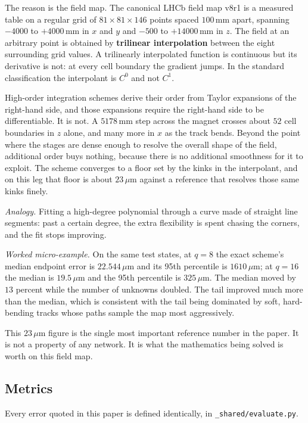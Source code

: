 \documentclass[11pt,a4paper]{article}
\newcommand{\um}{\ensuremath{\,\mu\mathrm{m}}}
\newcommand{\mm}{\ensuremath{\,\mathrm{mm}}}
\begin{document}
The reason is the field map. The canonical LHCb field map v8r1 is a measured
table on a regular grid of $81 \times 81 \times 146$ points spaced $100\mm$
apart, spanning $-4000$ to $+4000\mm$ in $x$ and $y$ and $-500$ to
$+14000\mm$ in $z$. The field at an arbitrary point is obtained by
\textbf{trilinear interpolation} between the eight surrounding grid values. A
trilinearly interpolated function is continuous but its derivative is not: at
every cell boundary the gradient jumps. In the standard classification the
interpolant is $C^0$ and not $C^1$.

High-order integration schemes derive their order from Taylor expansions of the
right-hand side, and those expansions require the right-hand side to be
differentiable. It is not. A $5178\mm$ step across the magnet crosses about $52$
cell boundaries in $z$ alone, and many more in $x$ as the track bends. Beyond
the point where the stages are dense enough to resolve the overall shape of the
field, additional order buys nothing, because there is no additional smoothness
for it to exploit. The scheme converges to a floor set by the kinks in the
interpolant, and on this leg that floor is about $23\um$ against a reference
that resolves those same kinks finely.

\emph{Analogy.} Fitting a high-degree polynomial through a curve made of
straight line segments: past a certain degree, the extra flexibility is spent
chasing the corners, and the fit stops improving.

\emph{Worked micro-example.} On the same test states, at $q = 8$ the exact
scheme's median endpoint error is $22.544\um$ and its 95th percentile is
$1610\um$; at $q = 16$ the median is $19.5\um$ and the 95th percentile is
$325\um$. The median moved by $13$ percent while the number of unknowns doubled.
The tail improved much more than the median, which is consistent with the tail
being dominated by soft, hard-bending tracks whose paths sample the map most
aggressively.

This $23\um$ figure is the single most important reference number in the paper.
It is not a property of any network. It is what the mathematics being solved is
worth on this field map.

\subsection{Metrics}
\label{sec:metrics}

Every error quoted in this paper is defined identically, in
\texttt{\_shared/evaluate.py}.
\end{document}
